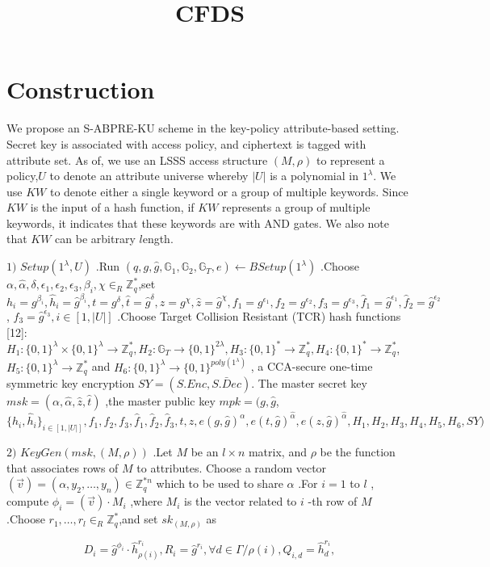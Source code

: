 \documentclass[runningheads]{llncs}
\begin{document}
\title{CFDS}

\section{Construction}
We propose an S-ABPRE-KU scheme in the key-policy attribute-based setting. Secret key is associated with access policy, and ciphertext is tagged with attribute set. As of, we use an LSSS access structure $(M,\rho)$ to represent a policy,$U$ to denote an attribute universe whereby $| U|$ is a polynomial in $1^\lambda .$ We use $KW$ to denote either a single keyword or a group of multiple keywords. Since $KW$ is the input of a hash function, if $KW$ represents a group of multiple keywords, it indicates that these keywords are with AND gates. We also note that $KW$ can be arbitrary $l$ength.

$1) \textit{ Setup}( 1^\lambda , U)$ .Run $(q,g,\hat{g},\mathbb{G}_1,\mathbb{G}_2,\mathbb{G}_T,e)\leftarrow BSetup(1^\lambda)$ .Choose $\alpha,\hat{\alpha},\delta,\epsilon_1,\epsilon_2,\epsilon_3,\beta_i,\chi\in_R\mathbb{Z}_q^*$,set
$h_i=g^{\beta_i},\hat{h}_i=\hat{g}^{\beta_i},t=g^\delta,\hat{t}=\hat{g}^\delta,z=g^\chi,\hat{z}=\hat{g}^\chi,f_1=g^{\epsilon_1},f_2=g^{\epsilon_2},f_3=g^{\epsilon_3},\hat{f}_1=\hat{g}^{\epsilon_1},\hat{f}_2=\hat{g}^{\epsilon_2}$,
$\hat{f}_3=\hat{g}^{\epsilon_3},i\in[1,|U|]$ .Choose Target Collision Resistant (TCR) hash functions [12]:
$H_1:\{0,1\}^\lambda\times\{0,1\}^\lambda\to\mathbb{Z}_q^*,H_2:\mathbb{G}_T\to\{0,1\}^{2\lambda},H_3:\{0,1\}^*\to\mathbb{Z}_q^*,H_4:\{0,1\}^*\to\mathbb{Z}_q^*$,
$H_5:\{0,1\}^\lambda\to\mathbb{Z}_q^*$ and $H_6:\{0,1\}^\lambda\to\{0,1\}^{poly(1^\lambda)}$ , a CCA-secure one-time symmetric key encryption $SY=(S.Enc,\bar{S.Dec}).$ The master secret key $msk=(\alpha,\hat{\alpha},\hat{z},\hat{t})$ ,the master public key $mpk=(g,\hat{g}$, $\{h_i,\hat{h}_i\}_{i\in[1,|U|]},f_1,f_2,f_3,\hat{f}_1,\hat{f}_2,\hat{f}_3,t,z,e(g,\hat{g})^\alpha,e(t,\hat{g})^{\hat{\alpha}},e(z,\hat{g})^{\hat{\alpha}},H_1,H_2,H_3,H_4,H_5,H_6,SY)$

$2) \textit{ KeyGen}( msk, ( M, \rho ) )$ .Let $M$ be an $l\times n$ matrix, and $\rho$ be the function that associates rows of $M$ to
attributes. Choose a random vector $(\vec{v})=(\alpha,y_2,\ldots,y_n)\in\mathbb{Z}_q^{*n}$ which to be used to share $\alpha$ .For $i=1$ to $l$ , compute $\phi_i=(\vec{v})\cdot M_i$ ,where $M_i$ is the vector related to $i$ -th row of $M$ .Choose $r_1,\ldots,r_l\in_R\mathbb{Z}_q^*$,and set $sk_{(M,\rho)}$ as

$$D_i=\hat{g}^{\phi_i}\cdot\hat{h}_{\rho(i)}^{r_i},R_i=\hat{g}^{r_i},\forall d\in\Gamma/\rho(i),Q_{i,d}=\hat{h}_d^{r_i},$$
\end{document}

